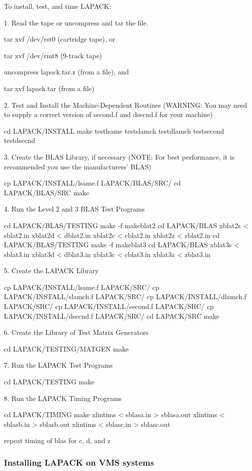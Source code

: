 To install, test, and time LAPACK:

1. Read the tape or uncompress and tar the file.

   tar  xvf  /dev/rst0  (cartridge tape),  or

   tar  xvf  /dev/rmt8  (9-track tape)
  
   uncompress lapack.tar.z (from a file), and

   tar xvf lapack.tar      (from a file)

2. Test and Install the Machine-Dependent Routines
   (WARNING:  You may need to supply a correct version of second.f and
              dsecnd.f for your machine)

   cd LAPACK/INSTALL
   make
   testlsame
   testslamch
   testdlamch
   testsecond
   testdsecnd

3. Create the BLAS Library, if necessary
   (NOTE:  For best performance, it is recommended you use the
           manufacturers' BLAS)

   cp LAPACK/INSTALL/lsame.f LAPACK/BLAS/SRC/
   cd LAPACK/BLAS/SRC
   make

4. Run the Level 2 and 3 BLAS Test Programs

   cd LAPACK/BLAS/TESTING
   make -f makeblat2
   cd LAPACK/BLAS
   xblat2s < sblat2.in
   xblat2d < dblat2.in
   xblat2c < cblat2.in
   xblat2z < zblat2.in
   cd LAPACK/BLAS/TESTING
   make -f makeblat3
   cd LAPACK/BLAS 
   xblat3s < sblat3.in
   xblat3d < dblat3.in
   xblat3c < cblat3.in
   xblat3z < zblat3.in

5. Create the LAPACK Library

   cp LAPACK/INSTALL/lsame.f LAPACK/SRC/
   cp LAPACK/INSTALL/slamch.f LAPACK/SRC/
   cp LAPACK/INSTALL/dlamch.f LAPACK/SRC/
   cp LAPACK/INSTALL/second.f LAPACK/SRC/
   cp LAPACK/INSTALL/dsecnd.f LAPACK/SRC/
   cd LAPACK/SRC
   make

6. Create the Library of Test Matrix Generators

   cd LAPACK/TESTING/MATGEN
   make

7. Run the LAPACK Test Programs

   cd LAPACK/TESTING
   make

8. Run the LAPACK Timing Programs

   cd LAPACK/TIMING
   make
   xlintims < sblasa.in > sblasa.out
   xlintims < sblasb.in > sblasb.out
   xlintims < sblasc.in > sblasc.out

   repeat timing of blas for c, d, and z

\subsubsection{Installing LAPACK on VMS systems}

